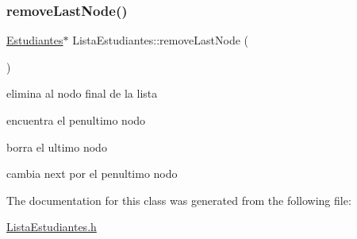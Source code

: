 \subsubsection{\texorpdfstring{remove\+Last\+Node()}{removeLastNode()}}
{\footnotesize\ttfamily \hyperlink{classEstudiantes}{Estudiantes}$\ast$ Lista\+Estudiantes\+::remove\+Last\+Node (\begin{DoxyParamCaption}{ }\end{DoxyParamCaption})\hspace{0.3cm}{\ttfamily [inline]}}



elimina al nodo final de la lista 

encuentra el penultimo nodo

borra el ultimo nodo

cambia next por el penultimo nodo

The documentation for this class was generated from the following file\+:\begin{DoxyCompactItemize}
\item 
\hyperlink{ListaEstudiantes_8h}{Lista\+Estudiantes.\+h}\end{DoxyCompactItemize}
